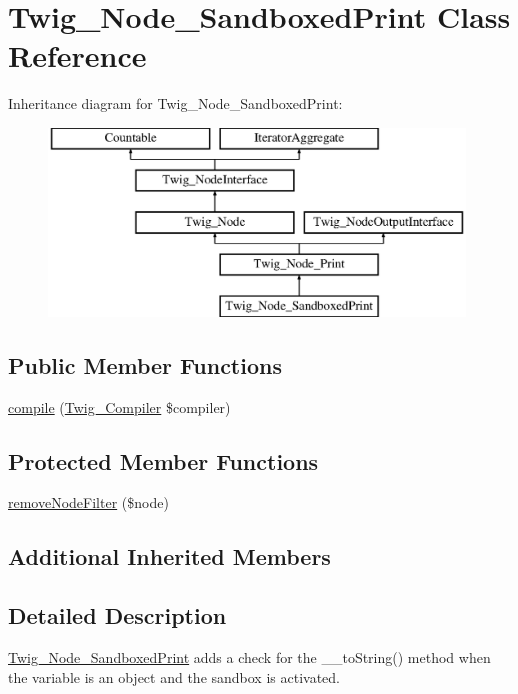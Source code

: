 \hypertarget{classTwig__Node__SandboxedPrint}{}\section{Twig\+\_\+\+Node\+\_\+\+Sandboxed\+Print Class Reference}
\label{classTwig__Node__SandboxedPrint}
Inheritance diagram for Twig\+\_\+\+Node\+\_\+\+Sandboxed\+Print\+:\begin{figure}[H]
\begin{center}
\leavevmode
\includegraphics[height=5.000000cm]{classTwig__Node__SandboxedPrint}
\end{center}
\end{figure}
\subsection*{Public Member Functions}
\begin{DoxyCompactItemize}
\item 
\hyperlink{classTwig__Node__SandboxedPrint_ab54c817615a5ccc071513e7e1e4cb724}{compile} (\hyperlink{classTwig__Compiler}{Twig\+\_\+\+Compiler} \$compiler)
\end{DoxyCompactItemize}
\subsection*{Protected Member Functions}
\begin{DoxyCompactItemize}
\item 
\hyperlink{classTwig__Node__SandboxedPrint_a7148f16243c798f36d7b600fdb7138fd}{remove\+Node\+Filter} (\$node)
\end{DoxyCompactItemize}
\subsection*{Additional Inherited Members}


\subsection{Detailed Description}
\hyperlink{classTwig__Node__SandboxedPrint}{Twig\+\_\+\+Node\+\_\+\+Sandboxed\+Print} adds a check for the \+\_\+\+\_\+to\+String() method when the variable is an object and the sandbox is activated.

